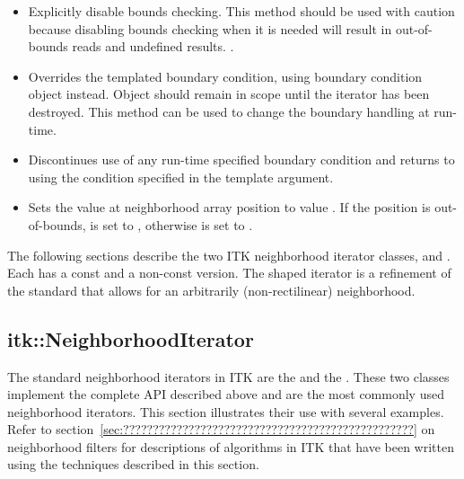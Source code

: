 {\begin{itemize}
\item \textbf{} Explicitly disable
bounds checking. This method should be used with caution because disabling
bounds checking when it is needed will result in out-of-bounds reads and
undefined results.
.
\item \textbf{} 
Overrides the templated boundary condition, using boundary condition object
 instead. Object  should remain in scope until the iterator has
been destroyed.  This method can be used to change the boundary handling at
run-time.

\item \textbf{} Discontinues use of any
run-time specified boundary condition and returns to using the condition
specified in the template argument.

\item \textbf{} Sets the value at neighborhood array position  to value
.  If the position  is out-of-bounds,  is set to
, otherwise  is set to .
\end{itemize}


The following sections describe the two ITK neighborhood iterator classes,
 and .
Each has a const and a non-const version.  The shaped iterator is a refinement
of the standard  that allows for an arbitrarily
(non-rectilinear) neighborhood.

\subsection{itk::NeighborhoodIterator}
\label{sec:itkNeighborhoodIterator}
The standard neighborhood iterators in ITK are the
 and the 
.  These two classes implement the complete API
described above and are the most commonly used neighborhood iterators.  This
section illustrates their use with several examples.  Refer to
section~\ref{sec:?????????????????????????????????????????????????} on
neighborhood filters for descriptions of algorithms in ITK that have been
written using the techniques described in this section.

}
